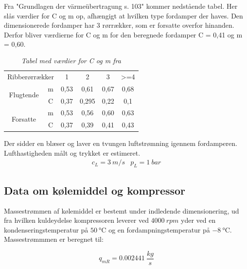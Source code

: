 \documentclass[../Hovedrapport.tex]{subfiles}
\begin{document}
Fra "Grundlagen der värmeübertragung s. 103" kommer nedstående tabel. Her slås værdier for C og m op, afhængigt at hvilken type fordamper der haves. Den dimensionerede fordamper har 3 rørrækker, som er forsatte overfor hinanden. Derfor bliver værdierne for C og m for den beregnede fordamper C = 0,41 og m = 0,60.

  \begin{table}[H]
    \centering
    \begin{tabular}{|c|c|c|c|c|c|} \hline \rowcolor[gray]{.95}
    \multicolumn{6}{|c|}{Værdier for C og m ud fra rørrækkeantal}              \\ \hline
    \multicolumn{2}{|c|}{Ribberørrækker} & 1  & 2  & 3  & >=4       \\ \hline
    \multirow{2}{*}{Flugtende} & m  & 0,53 & 0,61  & 0,67  & 0,68   \\ \cline{2-6}
     & C  & 0,37  & 0,295  & 0,22  & 0,1                            \\  \hline
    \multirow{2}{*}{Forsatte} & m  & 0,53  & 0,56  & \cellcolor{green!25} 0,60  & 0,63   \\ \cline{2-6}
     & C  & 0,37  & 0,39  & \cellcolor{green!25} 0,41 & 0,43                             \\ \hline
    \end{tabular}
    \caption{\textit{Tabel med værdier for C og m fra \citep{endetarm}}} 
    \end{table}
Der sidder en blæser og laver en tvungen luftstrømning igennem fordamperen. Lufthastigheden målt og trykket er estimeret.
\begin{align}
   c_{\textit{{L}}}= \SI{3}{m/s} & p_{\textit{{L}}}= \SI{1}{bar}
\end{align}


\subsection{Data om kølemiddel og kompressor}
Massestrømmen af kølemiddel er bestemt under indledende dimensionering, ud fra hvilken kuldeydelse kompressoren leverer ved $\SI{4000}{rpm}$ yder ved en kondenseringstemperatur på $\SI{50}{\celsius}$ og en fordampningstemperatur på $\SI{-8}{\celsius}$. Massestrømmmen er beregnet  til:


\begin{equation}
q_{mR} = \SI{0,002441}{\frac{kg}{s}}
\end{equation}
\end{document}
